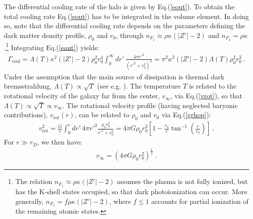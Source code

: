 \documentclass[12pt]{article}
\begin{document}
{{The differential cooling rate of the halo is given by Eq.(\ref{eout}). To obtain the total cooling rate Eq.(\ref{eout}) has to be integrated in the volume element. In doing so, note that the differential cooling rate depends on the parameters defining the dark matter density profile, $\rho _0$ and $r _0$, through $n _{F _1} \approx \rho \kappa (|Z'|-2)$ and $n _{F_2} = \rho \kappa$.\footnote{The relation $n _{F_1} \approx \rho \kappa (|Z'|-2)$ assumes the plasma is not fully ionized, but has the K-shell states occupied, so that dark photoionization can occur. More generally, $n _{F_1} = f\rho \kappa (|Z'|-2)$, where $f \leq 1$ accounts for partial ionization of the remaining atomic states.} Integrating Eq.(\ref{eout}) yields:
%
\begin{eqnarray}
\Gamma _{\text{cool}} = \Lambda (T)\kappa ^2 (|Z'|-2)\rho _0 ^2r _0 ^4\int _0 ^{\infty} dr' \ \frac{4\pi {r'} ^2}{({r'} ^2 + r _0 ^2) ^2} = \pi ^2\kappa ^2(|Z'|-2)\Lambda (T)\rho _0 ^2r _0 ^3 \ .
\label{tullyfishereout}
\end{eqnarray}
%
Under the assumption that the main source of dissipation is thermal dark bremsstrahlung, $\Lambda (T) \propto \sqrt{T}$ (see e.g. \cite{radiative}). The temperature $T$ is related to the rotational velocity of the galaxy far from the center, $v _{\infty}$, via Eq.(\ref{vrot}), so that $\Lambda (T) \propto \sqrt{T} \propto v _{\infty}$. The rotational velocity profile (having neglected baryonic contributions), $v _{\text{rot}}(r)$, can be related to $\rho _0$ and $r _0$ via Eq.(\ref{grhop}):
%
\begin{eqnarray}
v _{\text{rot}} ^2 = \frac{G}{r} \int _0 ^r dr' \ 4\pi {r'} ^2 \frac{\rho _0r _0 ^2}{{r'} ^2 + r _0 ^2} = 4\pi G\rho _0 r _0 ^2 \left [1 - \frac{r _0}{r}\tan ^{-1} \left ( \frac{r}{r _0} \right ) \right ] \ .
\label{vrot1}
\end{eqnarray}
%
For $r \gg r _D$, we then have:
%
\begin{eqnarray}
v _{\infty} = \left (4\pi G\rho _0r _0 ^2 \right) ^{\frac{1}{2}} \ .
\label{vrot2}
\end{eqnarray}
% 

}}
\end{document}
